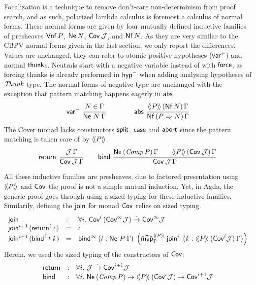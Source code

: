 \documentclass[a4paper,USenglish,cleveref, autoref]{lipics-v2019}
\begin{document}
Focalization is a technique to remove don't-care non-determinism from
proof search, and as such, polarized lambda calculus is foremost a
calculus of normal forms.
These normal forms are given by four mutually defined inductive
families of presheaves $\tVnf\,P$,
$\tNe\,N$, $\Cov\,\J$,
and $\tNf\,N$.  As they are very similar to the CBPV normal forms
given in the last section, we only report the differences.
%
Values  are unchanged, they can refer to
atomic positive hypotheses ($\pvar$) and normal $\tthunk$s.
%
Neutrals  start with a negative variable instead
of with $\tforce$, as forcing thunks is already performed in $\nhyp$
when adding analysing hypotheses of $\tThunk$ type.
%
The normal forms  of negative type are unchanged
with the exception that pattern matching happens eagerly in $\tabs$.
\[
  \nru{\nvar}{N \in \Gamma}{\Ne N \Gamma}
\qquad
\qquad
  \nru{\tabs}
      {\AddHypP P {\tNf\, N} \Gamma}
      {\NfP {P \To N} \Gamma}
\]
%
The Cover monad \fbox{$\Cover \J \Gamma$}
lacks constructors $\tsplit$, $\tcase$ and $\tabort$
since the pattern matching is taken care of by $\Add P$.
\begin{gather*}
  \nru{\treturn}{\J\,\Gamma}{\Cover \J \Gamma}
\qquad
  \nru{\tbind}
      {\NeP {\Comp P} \Gamma \qquad \AddHypP P {\Cov\,\J} \Gamma}
      {\Cover \J \Gamma}
\end{gather*}


All these inductive families are presheaves, due to factored
presentation using $\Add P$ and $\Cov$ the proof is not a simple
mutual induction.  Yet, in Agda, the generic proof goes through using a sized
typing for these inductive families.  Similarily, defining the
$\tjoin$ for monad $\Cov$ relies on sized typing.
\[
\begin{array}{lll}
  \tjoin & : & \forall i.\
    \Cov[i]\,(\Cov[\infty]\J) \todot \Cov[\infty]\J  \\
  \tjoin[i+1]\,(\treturn[i]\;c) & = & c \\
  \tjoin[i+1]\,(\tbind^i\;t\;k)
    & = & \tbind^\infty\;
     (t : \Ne P \Gamma)\;
     \left(\stmap[\Add P]_\Gamma\;\tjoin[i]\;
       \left(k : \AddHypP P {\Cov[i]\J} \Gamma
       \right)
     \right)
\end{array}
\]
Herein, we used the sized typing of the constructors of $\Cov$:
\[
\begin{array}{lll}
  \treturn & : & \forall i.\ \J \todot \Cov[i+1] \J \\
  \tbind  & : & \forall i.\
    \tNe\,(\Comp P) \todot \Add P\,(\Cov[i]\J) \todot \Cov[i+1]\J \\
\end{array}
\]
\end{document}
